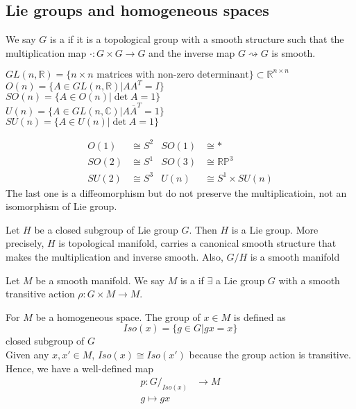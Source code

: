 \subsection{Lie groups and homogeneous spaces}

\begin{definition}
    We say  $ G  $ is a  if it is a topological group with a smooth structure such that the multiplication map $ \cdot : G \times G \to G $ and the inverse map  $ G\rightsquigarrow G  $  is smooth. 
\end{definition}
\begin{example}
     $ GL(n,\mathbb{R})=\{n\times n \text{ matrices with non-zero determinant}\}\subset \mathbb{R}^{n\times n } $\\
      $ O(n)=\{A\in GL(n,\mathbb{R})|AA^T=I\} $\\
       $ SO(n)=\{A\in O(n)|\det A=1\} $\\
        $ U(n)=\{A\in GL(n,\mathbb{C})|A\overline{A}^T=1\} $\\
         $ SU(n)=\{A\in U(n)|\det A=1\} $     
\end{example}
\begin{exercise}
    \begin{align}
        O(1)&\cong S^2 &SO(1)&\cong *\\
            SO(2)&\cong S^1 &SO(3)&\cong \mathbb{R}\mathbb{P}^3 \\
            SU(2)&\cong S^3 &U(n)&\cong S^1\times SU(n)
    \end{align}
    The last one is a diffeomorphism but do not preserve the multiplicatioin, \ie not an isomorphism of Lie group.
\end{exercise}
\begin{theorem}[Carton]
    Let  $ H  $ be a closed subgroup of Lie group  $ G  $. Then  $ H  $ is a Lie group. More precisely,  $ H  $ is topological manifold, carries a canonical smooth structure that makes  the multiplication and inverse smooth. Also,  $ G/H  $ is a smooth manifold
\end{theorem}
\begin{definition}
    Let  $ M  $ be a smooth manifold. We say   $ M  $ is a  if  $ \exists  $ a Lie group 
     $ G  $ with a smooth transitive action $ \rho: G\times M \rightarrow M  $.
\end{definition}
\begin{definition}
    For  $ M  $ be a homogeneous space.
    The  group of  $ x\in M  $ is defined as 
    \[Iso(x)=\{g\in G|gx=x\}\]
    closed subgroup of  $ G $\\
    Given any  $ x,x'\in M  $,  $ Iso(x)\cong Iso(x') $ because the group  action is transitive. \\
    Hence, we have a well-defined map 
    \begin{align}
        p:G/_{Iso(x)}&\rightarrow M \\
        g\mapsto gx
    \end{align}
\end{definition}
